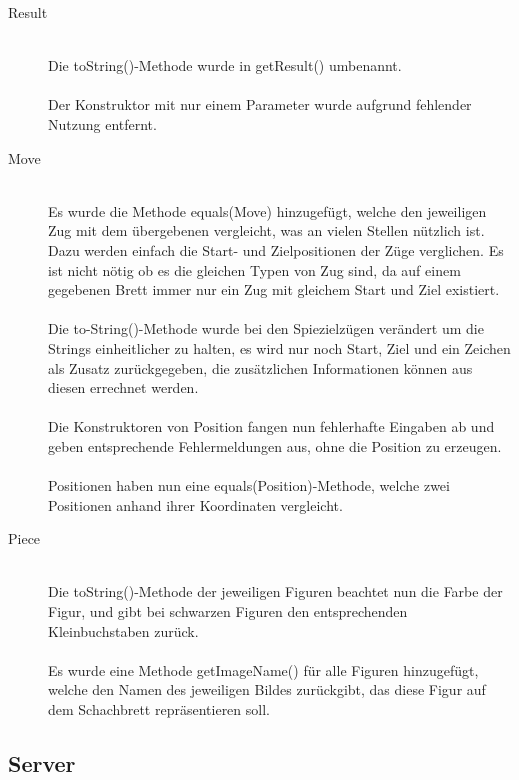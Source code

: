 \documentclass[parskip=full]{scrartcl}
\begin{document}
\begin{description}
		\item[Result]\hfill \\ Die toString()-Methode wurde in getResult() umbenannt.\\
		\\
		Der Konstruktor mit nur einem Parameter wurde aufgrund fehlender Nutzung entfernt.
		
		\item[Move]\hfill \\ Es wurde die Methode equals(Move) hinzugefügt, welche den jeweiligen Zug mit dem übergebenen vergleicht, was an vielen Stellen nützlich ist. Dazu werden einfach die Start- und Zielpositionen der Züge verglichen. Es ist nicht nötig ob es die gleichen Typen von Zug sind, da auf einem gegebenen Brett immer nur ein Zug mit gleichem Start und Ziel existiert.\\
		\\
		Die to-String()-Methode wurde bei den Spiezielzügen verändert um die Strings einheitlicher zu halten, es wird nur noch Start, Ziel und ein Zeichen als Zusatz zurückgegeben, die zusätzlichen Informationen können aus diesen errechnet werden.\\
		\\
		Die Konstruktoren von Position fangen nun fehlerhafte Eingaben ab und geben entsprechende Fehlermeldungen aus, ohne die Position zu erzeugen.\\
		\\
		Positionen haben nun eine equals(Position)-Methode, welche zwei Positionen anhand ihrer Koordinaten vergleicht.
		\item[Piece]\hfill \\ Die toString()-Methode der jeweiligen Figuren beachtet nun die Farbe der Figur, und gibt bei schwarzen Figuren den entsprechenden Kleinbuchstaben zurück. \\
		\\
		Es wurde eine Methode getImageName() für alle Figuren hinzugefügt, welche den Namen des jeweiligen Bildes zurückgibt, das diese Figur auf dem Schachbrett repräsentieren soll.
		
		
		\end{description}
		\subsection{Server}
		
\end{document}
